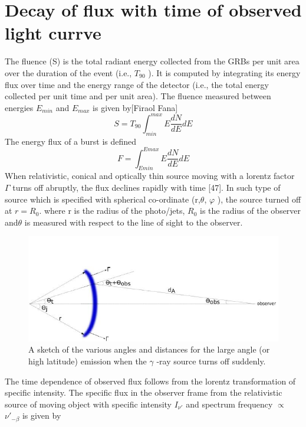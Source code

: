 \section{Decay of flux with time of observed light currve }
The fluence (S) is the total radiant energy collected from the GRBs per unit area over the duration of the event (i.e., $ T_{90} $ ). It is computed by integrating its energy flux over time and the energy range of the detector (i.e., the total energy collected per unit time and per unit area). The fluence measured between energies $ E_{min} $ and $ E_{max} $ is given by[Firaol Fana]
\begin{equation}
S= T_{90}\int_{min}^{max}E\frac{dN}{dE}dE
\end{equation}
The energy flux of a burst is defined
\begin{equation}
F=\int_{Emin}^{Emax}E\frac{dN}{dE}dE
\end{equation}
When relativistic, conical and optically thin source moving with a lorentz factor     $ \Gamma $ turns off abruptly, the flux declines rapidly with time [47]. In such type of source which is specified with spherical co-ordinate (r,$\theta $, $\varphi $ ), the source turned off at $ r =  R_{0} $. where r is the radius of the photo/jets, $ R_{0} $ is the radius of the observer and$ \theta $ is measured with respect to the line of sight to the observer.
\begin{figure}[h]
\begin{center}
\includegraphics[scale=0.5]{Figures/Flux.png}
\caption{ A sketch of the various angles and distances for the large angle (or high
latitude) emission when the $\gamma$ -ray source turns off suddenly.}
\end{center}
\end{figure}
The time dependence of observed flux follows from the lorentz transformation of
specific intensity. The specific flux in the observer frame from the relativistic source of moving object with specific intensity $ I_{\nu'} $ and spectrum frequency $\propto $ $ \nu'_{-\beta} $ is given by
